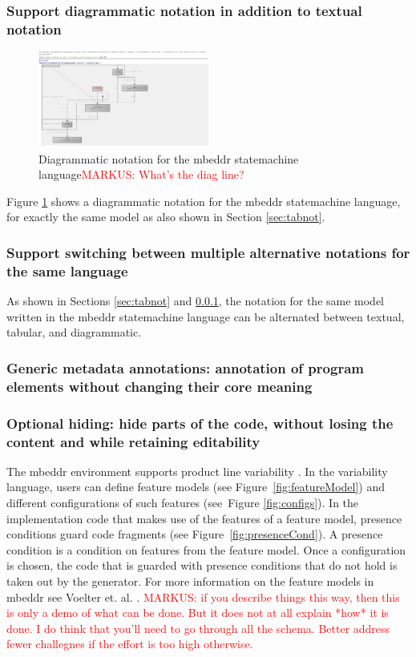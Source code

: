 \documentclass[preprint,numbers,10pt]{sigplanconf}
\newcommand\markus[1]{\textcolor{red}{MARKUS: {#1}}}
\begin{document}
\subsubsection{Support diagrammatic notation in addition to textual notation}\label{sec:dianot}
\begin{figure}[H]
	\centering
	\includegraphics[width=0.50\textwidth]{screens/DiagrammaticNotationStatemachines.png}
	\caption{Diagrammatic notation for the mbeddr statemachine
	language\markus{What's the diag line?}}
	\label{fig:dianotationsm}
\end{figure}
Figure \ref{fig:dianotationsm} shows a diagrammatic notation for the mbeddr statemachine language, for exactly the same model as also shown in Section \ref{sec:tabnot}.

\subsubsection{Support switching between multiple alternative notations for the same language}
As shown in Sections \ref{sec:tabnot} and \ref{sec:dianot}, the notation for the same model written in the mbeddr statemachine language can be alternated between textual, tabular, and diagrammatic.

\subsubsection{Generic metadata annotations: annotation of program elements without changing their core meaning}
\subsubsection{Optional hiding: hide parts of the code, without losing the content and while retaining editability}
The mbeddr environment supports product line variability \cite{voelter2015using}. In the variability language, users can define
feature models (see Figure~\ref{fig:featureModel}) and
different configurations of such features (see~Figure \ref{fig:configs}).
In the implementation code that makes use of the features of a feature model, presence conditions guard
code fragments (see Figure~\ref{fig:presenceCond}). A presence condition is a condition on features from the feature model. 
Once a configuration is chosen, the code that is guarded with presence conditions that do not hold is taken out by the generator.
For more information on the feature models in mbeddr see Voelter et. al. \cite{voelter2013mbeddr}.
\markus{if you describe things this way, then this is only a demo of what can
be done. But it does not at all explain *how* it is done. I do think that you'll
need to go through all the schema. Better address fewer challegnes if the effort
is too high otherwise. }
\end{document}
